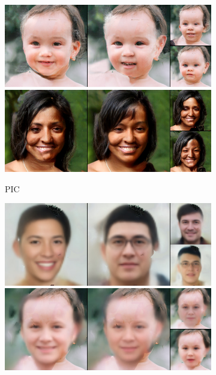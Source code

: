 \begin{figure}[t]
\begin{subfigure}[t]{0.25\textwidth}
      \includegraphics[height=\ffhqimgheight]{figs/cigcvae/image-samples/ffhq256/freeform_pic_13_samples.jpg}
      \includegraphics[height=\ffhqimgheight]{figs/cigcvae/image-samples/ffhq256/freeform_pic_32_samples.jpg}
      \caption{PIC}
    \end{subfigure}
    \begin{subfigure}[t]{0.25\textwidth}
      \centering
      \includegraphics[height=\ffhqimgheight]{figs/cigcvae/image-samples/ffhq256/freeform_anp_0_samples.jpg}
      \includegraphics[height=\ffhqimgheight]{figs/cigcvae/image-samples/ffhq256/freeform_anp_13_samples.jpg}

\end{subfigure}
\end{figure}
